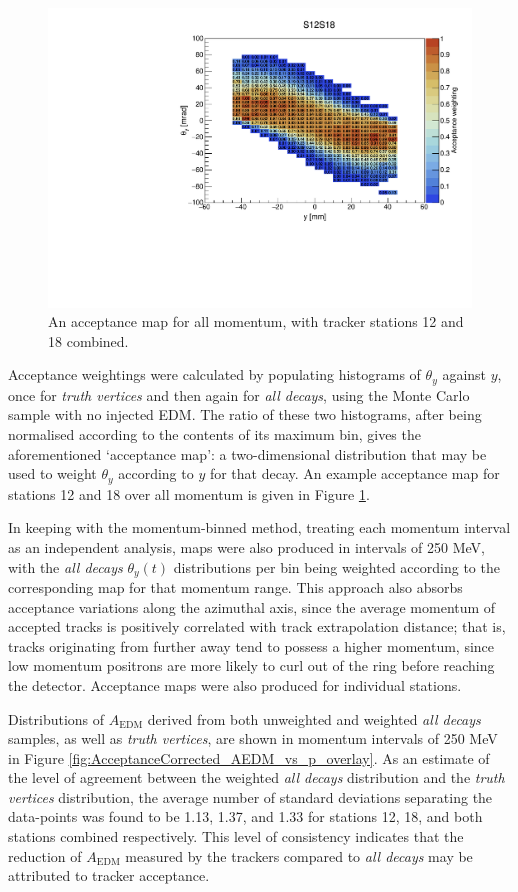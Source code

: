 \begin{figure}[t!]
\centering{}
\includegraphics[trim={0 0 0 1cm},clip,width=.69\textwidth]{Images/Chapter5/S12S18_AcceptanceMapY_0_3127_MeV.pdf}
\caption{An acceptance map for all momentum, with tracker stations 12 and 18 combined.}
\label{fig:S12S18_AcceptanceMapY_0_3127_MeV}
\end{figure}

Acceptance weightings were calculated by populating histograms of $\theta_{y}$ against $y$, once for \textit{truth vertices} and then again for \textit{all decays}, using the Monte Carlo sample with no injected EDM. The ratio of these two histograms, after being normalised according to the contents of its maximum bin, gives the aforementioned `acceptance map': a two-dimensional distribution that may be used to weight $\theta_{y}$ according to $y$ for that decay. An example acceptance map for stations 12 and 18 over all momentum is given in Figure \ref{fig:S12S18_AcceptanceMapY_0_3127_MeV}. 

In keeping with the momentum-binned method, treating each momentum interval as an independent analysis, maps were also produced in intervals of 250 MeV, with the \textit{all decays} $\theta_{y}(t)$ distributions per bin being weighted according to the corresponding map for that momentum range. This approach also absorbs acceptance variations along the azimuthal axis, since the average momentum of accepted tracks is positively correlated with track extrapolation distance; that is, tracks originating from further away tend to possess a higher momentum, since low momentum positrons are more likely to curl out of the ring before reaching the detector. Acceptance maps were also produced for individual stations.

Distributions of $A_{\text{EDM}}$ derived from both unweighted and weighted \textit{all decays} samples, as well as \textit{truth vertices}, are shown in momentum intervals of 250 MeV in Figure \ref{fig:AcceptanceCorrected_AEDM_vs_p_overlay}. As an estimate of the level of agreement between the weighted \textit{all decays} distribution and the \textit{truth vertices} distribution, the average number of standard deviations separating the data-points was found to be 1.13, 1.37, and 1.33 for stations 12, 18, and both stations combined respectively. This level of consistency indicates that the reduction of $A_{\text{EDM}}$ measured by the trackers compared to \textit{all decays} may be attributed to tracker acceptance.  


